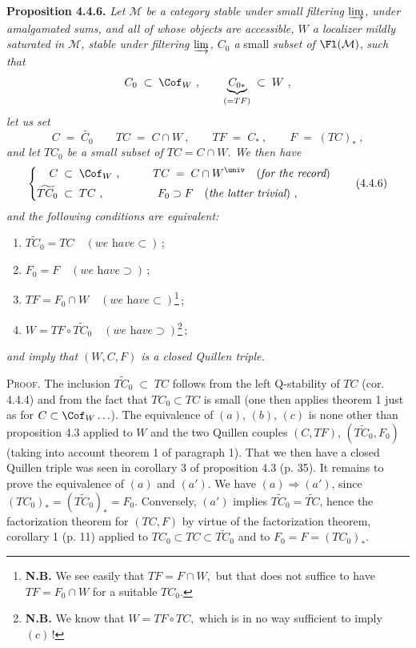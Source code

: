 \textbf{Proposition 4.4.6.} \textit{Let $\mathcal{M}$ be a category stable under small filtering $\varinjlim$, under amalgamated sums, and all of whose objects are accessible, $W$ a localizer}
\textit{mildly saturated in $\mathcal{M}$, stable under filtering $\varinjlim$, $C_0$ a} small \textit{subset of} $\Fl(\mathcal{M})$, \textit{such that}
\[
C_0\;\subset\;\Cof_W\ ,\qquad \underbrace{C_{0*}}_{(=TF)}\;\subset\;W\ ,
\]
\textit{let us set}
\[
C\;=\;\widetilde{C_0}\qquad TC\;=\;C\cap W\ ,\qquad TF\;=\;C_*\ ,\qquad F\;=\;(TC)_*\ ,
\]
\textit{and let $TC_0$ be a small subset of $TC=C\cap W$. We then have}
\[
\left\{
\begin{aligned}
C &\;\subset\;\Cof_W\ , &\qquad TC &\;=\;C\cap W^{\univ}\quad(\textit{for the record})\\
\widetilde{TC_0} &\;\subset\;TC\ , & F_0 &\supset F\quad(\textit{the latter trivial})\ ,
\end{aligned}
\right.
\tag*{(4.4.6)}
\]
\textit{and the following conditions are equivalent:}
\begin{enumerate}[leftmargin=*]
\item[a)] $\widetilde{TC_0}=TC\quad(\textit{we have}\subset)$\,;
\item[a$'$)] $F_0=F\quad(\textit{we have}\supset)$\,;
\item[b)] $TF=F_0\cap W\quad(\textit{we have}\subset)$\footnote[14]{\textbf{N.B.} We see easily that $\boxed{TF=F\cap W,}$ but that does not suffice to have $TF=F_0\cap W$ for a suitable $TC_0$.}\,;
\item[c)] $W=TF\circ\widetilde{TC_0}\quad(\textit{we have}\supset)$\footnote[15]{\textbf{N.B.} We know that $\boxed{W=TF\circ TC,}$ which is in no way sufficient to imply $(c)$\,!}\,;
\end{enumerate}
\textit{and imply that $(W,C,F)$ is a closed Quillen triple.}

\textsc{Proof.} The inclusion $\widetilde{TC_0}\;\subset\;TC$ follows from the left Q-stability of $TC$ (cor. 4.4.4) and from the fact that $TC_0\subset TC$ is small (one then applies theorem 1 just as for $C\subset\Cof_W\ldots$). The equivalence of $(a)$, $(b)$, $(c)$ is none other than proposition 4.3 applied to $W$ and the two Quillen couples $(C,TF)$, $(\widetilde{TC_0},F_0)$ (taking into account theorem 1 of paragraph 1). That we then have a closed Quillen triple was seen in corollary 3 of proposition 4.3 (p. 35). It remains to prove the equivalence of $(a)$ and $(a')$. We have $(a)\Longrightarrow(a')$, since $(TC_0)_*=(\widetilde{TC_0})_*=F_0$. Conversely, $(a')$ implies $\widetilde{TC_0}=\widetilde{TC}$, hence the factorization theorem for $(TC,F)$ by virtue of the factorization theorem, corollary 1 (p. 11) applied to $TC_0\subset TC\subset\widetilde{TC_0}$ and to $F_0=F=(TC_0)_*$.

